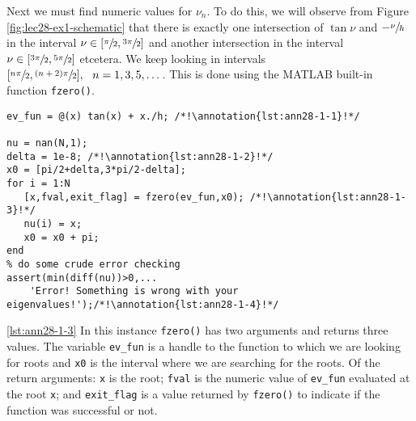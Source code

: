 Next we must find numeric values for $\nu_n$.  To do this, we will observe from Figure \ref{fig:lec28-ex1-schematic} that there is exactly one intersection of $\tan{\nu}$ and $-\sfrac{\nu}{h}$ in the interval $\nu \in [\sfrac{\pi}{2}, \sfrac{3\pi}{2}]$ and another intersection in the interval $\nu \in [\sfrac{3\pi}{2}, \sfrac{5\pi}{2}]$ etcetera.  We keep looking in intervals $[\sfrac{n \pi}{2},\sfrac{(n+2)\pi}{2}], \ \ n=1,3,5,\dots$.  This is done using the MATLAB built-in function \lstinline[style=myMatlab]{fzero()}.
\begin{lstlisting}[name=lec28-ex1, style=myMatlab]
%% Find the desired number of eigenvalues
ev_fun = @(x) tan(x) + x./h; /*!\annotation{lst:ann28-1-1}!*/

nu = nan(N,1);
delta = 1e-8; /*!\annotation{lst:ann28-1-2}!*/
x0 = [pi/2+delta,3*pi/2-delta];
for i = 1:N
   [x,fval,exit_flag] = fzero(ev_fun,x0); /*!\annotation{lst:ann28-1-3}!*/
   nu(i) = x;
   x0 = x0 + pi;
end
% do some crude error checking
assert(min(diff(nu))>0,...
    'Error! Something is wrong with your eigenvalues!');/*!\annotation{lst:ann28-1-4}!*/

\end{lstlisting}
\noindent \ref{lst:ann28-1-3} In this instance \lstinline[style=myMatlab]{fzero()} has two arguments and returns three values.  The variable \lstinline[style=myMatlab]{ev_fun} is a handle to the function to which we are looking for roots and \lstinline[style=myMatlab]{x0} is the interval where we are searching for the roots.  Of the return arguments: \lstinline[style=myMatlab]{x} is the root; \lstinline[style=myMatlab]{fval} is the numeric value of \lstinline[style=myMatlab]{ev_fun} evaluated at the root \lstinline[style=myMatlab]{x}; and \lstinline[style=myMatlab]{exit_flag} is a value returned by \lstinline[style=myMatlab]{fzero()} to indicate if the function was successful or not.


